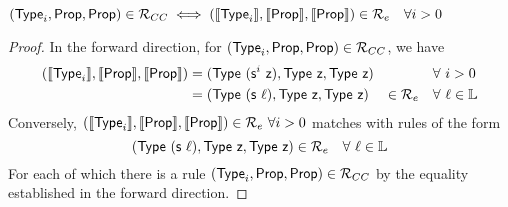 \documentclass[10pt]{article}
\begin{document}
\begin{lemma}
  \label{lem:Re-equiv}
  $(\textsf{Type}_i,\textsf{Prop},\textsf{Prop}) \in \mathcal{R}_{CC} \iff (\llbracket \textsf{Type}_i \rrbracket,\llbracket \textsf{Prop} \rrbracket,\llbracket \textsf{Prop} \rrbracket) \in \mathcal{R}_e \quad \forall i > 0$
  \begin{proof}
    In the forward direction, for $(\textsf{Type}_i,\textsf{Prop},\textsf{Prop}) \in \mathcal{R}_{CC}$, we have
    \begin{align*}
      (\rew{\Type_i},\rew{\Prop},\rew{\Prop}) &= (\Type\ (\s^i\ \z),\Type\ \z, \Type\ \z) &&\forall\ i > 0\\
                                              &= (\Type\ (\s\ \l),\Type\ \z, \Type\ \z) & \in \R_e \quad &\forall\ \l \in \mathbb{L}
    \end{align*}
    Conversely, $(\rew{\Type_i},\rew{\Prop},\rew{\Prop}) \in \R_e\ \forall i > 0$ matches with rules of the form $$(\textsf{Type}\ (\textsf{s}\ \ell),\textsf{Type}\ \textsf{z}, \textsf{Type}\ \textsf{z})  \in \mathcal{R}_e \quad \forall\ \ell \in \mathbb{L}$$ For each of which there is a rule $(\textsf{Type}_i,\textsf{Prop},\textsf{Prop}) \in \mathcal{R}_{CC}$ by the equality established in the forward direction.
  \end{proof}
\end{lemma}
\end{document}
